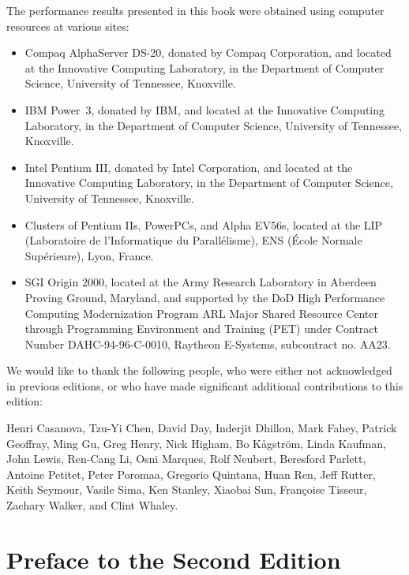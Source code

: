 The performance results presented in this book were obtained using
computer resources at various sites:
\begin{itemize}

\item
Compaq AlphaServer DS-20, donated by Compaq Corporation, and
located at the Innovative Computing Laboratory, in
the Department of Computer Science, University of Tennessee, Knoxville.

\item
IBM Power~3, donated by IBM, and located at the Innovative Computing
Laboratory, in the Department of Computer Science, University of
Tennessee, Knoxville.

\item
Intel Pentium III, donated by Intel Corporation, and
located at the Innovative Computing Laboratory, in
the Department of Computer Science, University of Tennessee, Knoxville.

\item
Clusters of Pentium IIs, PowerPCs, and Alpha EV56s, located at the LIP
(Laboratoire de l'Informatique du Parall\'{e}lisme), ENS (\'{E}cole
Normale Sup\'{e}rieure), Lyon, France.

\item
SGI Origin 2000, located at the Army Research Laboratory
in Aberdeen Proving Ground, Maryland, and supported by the DoD High
Performance Computing Modernization Program ARL Major Shared Resource Center
through Programming Environment and Training (PET) under Contract Number
DAHC-94-96-C-0010, Raytheon E-Systems, subcontract no. AA23.

\end{itemize}


We would like to thank the following people, who were either not
acknowledged in previous editions, or who have made significant
additional contributions to this edition:
 
Henri Casanova,
Tzu-Yi Chen,
David Day,
Inderjit Dhillon,
Mark Fahey,
Patrick Geoffray,
Ming Gu,
Greg Henry,
Nick Higham,
Bo K{\aa}gstr\"{o}m,
Linda Kaufman,
John Lewis,
Ren-Cang Li,
Osni Marques,
Rolf Neubert,
Beresford Parlett,
Antoine Petitet,
Peter Poromaa,
Gregorio Quintana,
Huan Ren,
Jeff Rutter,
Keith Seymour,
Vasile Sima,
Ken Stanley,
Xiaobai Sun,
Fran\c{c}oise Tisseur,
Zachary Walker, and
Clint Whaley. \\

\vspace{1in}

\chapter*{Preface to the Second Edition}

